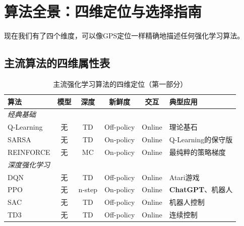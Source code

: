 \section{算法全景：四维定位与选择指南}

现在我们有了四个维度，可以像GPS定位一样精确地描述任何强化学习算法。

\subsection{主流算法的四维属性表}

\begin{table}[htbp]
\centering
\small
\renewcommand{\arraystretch}{1.35}
\caption{主流强化学习算法的四维定位（第一部分）}
\begin{tabular}{l|c|c|c|c|p{3.5cm}}
\toprule
\textbf{算法} & \textbf{模型} & \textbf{深度} & \textbf{新鲜度} & \textbf{交互} & \textbf{典型应用} \\
\midrule
\multicolumn{6}{l}{\textit{经典基础}} \\
\midrule
Q-Learning & 无 & TD & Off-policy & Online & 理论基石 \\
SARSA & 无 & TD & On-policy & Online & Q-Learning的保守版 \\
REINFORCE & 无 & MC & On-policy & Online & 最纯粹的策略梯度 \\
\midrule
\multicolumn{6}{l}{\textit{深度强化学习}} \\
\midrule
DQN & 无 & TD & Off-policy & Online & Atari游戏 \\
PPO & 无 & n-step & On-policy & Online & \textbf{ChatGPT}、机器人 \\
SAC & 无 & TD & Off-policy & Online & 机器人控制 \\
TD3 & 无 & TD & Off-policy & Online & 连续控制 \\
\bottomrule
\end{tabular}
\end{table}

